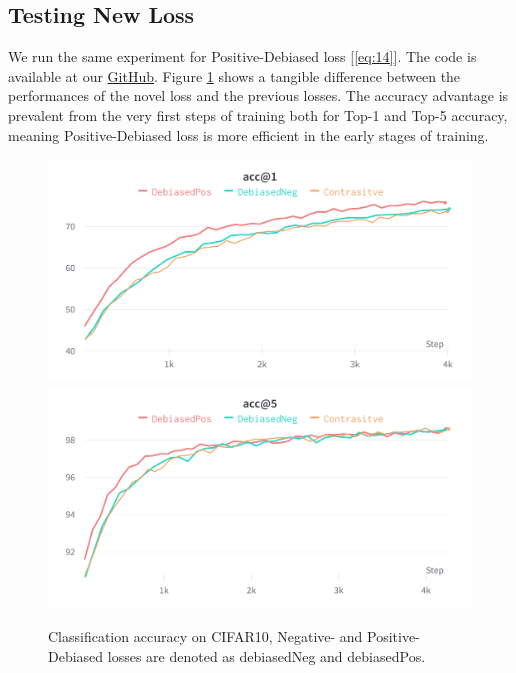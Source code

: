 \documentclass{article}
\begin{document}

\subsection{Testing New Loss}
We run the same experiment for Positive-Debiased loss [\ref{eq:14}]. The code is available at our \href{https://github.com/intsystems/2023-Project-123}{GitHub}. Figure \ref{fig:fig2} shows a tangible difference between the performances of the novel loss and the previous losses. The accuracy advantage is prevalent from the very first steps of training both for Top-1 and Top-5 accuracy, meaning Positive-Debiased loss is more efficient in the early stages of training.

\begin{figure}[!htb]
\includegraphics[width=\linewidth]{figures/3_losses.png}
\endminipage\hfill
{}
\includegraphics[width=\linewidth]{figures/3_losses_5.png}
\endminipage
\caption{Classification accuracy on CIFAR10, Negative- and Positive-Debiased losses are denoted as debiasedNeg and debiasedPos.}
\label{fig:fig2}
\end{figure}
\end{document}
